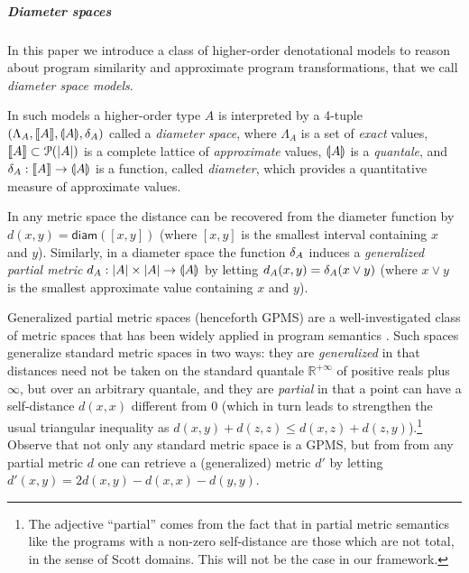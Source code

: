 





\subparagraph*{Diameter spaces}



In this paper we introduce a class of higher-order denotational models to reason about program similarity and approximate program transformations, that we call \emph{diameter space models}.

In such models a higher-order type $A$ is interpreted by a 4-tuple $(\Lambda_A, \llbracket A \rrbracket, \llparenthesis A \rrparenthesis, \delta_{A})$ called a \emph{diameter space}, where $\Lambda_A$ is a set of \emph{exact} values, $\llbracket A \rrbracket\subset \mathcal P(|A|)$ is a complete lattice of \emph{approximate} values, $\llparenthesis A \rrparenthesis$ is a \emph{quantale}, and $\delta_{A}: \llbracket A \rrbracket\to \llparenthesis A \rrparenthesis$ is a function, called \emph{diameter}, which provides a quantitative measure of approximate values.


In any metric space the distance can be recovered from the diameter function by $d(x,y)=\mathsf{diam}([x,y])$ (where $[x,y]$ is the smallest interval containing $x$ and $y$). Similarly, in a diameter space the function $\delta_{A}$ induces a \emph{generalized partial metric} $d_{A}:|A|\times |A|\to \llparenthesis A \rrparenthesis$ by letting $d_{A}(x,y)=\delta_{A}(x\vee y)$ (where $x\vee y$ is the smallest approximate value containing $x$ and $y$). 


Generalized partial metric spaces (henceforth GPMS) are a well-investigated class of metric spaces that has been widely applied in program semantics \cite{}. 
Such spaces generalize standard metric spaces in two ways: they are \emph{generalized} in that distances need not be taken on the standard quantale $\mathbb R^{+\infty}$ of positive reals plus $\infty$, but over an arbitrary quantale, and they are \emph{partial} in that a point can have a self-distance $d(x,x)$ different from $0$ (which in turn leads to strengthen the usual triangular inequality as $d(x,y) + d(z,z)\leq d(x,z)+d(z,y)$).\footnote{The adjective ``partial'' comes from the fact that in partial metric semantics like \cite{} the  programs with a non-zero self-distance are those which are not total, in the sense of Scott domains. This will not be the case in our framework. 
}   
Observe that not only any standard metric space is a GPMS, but from from any partial metric $d$ one can retrieve a (generalized) metric $d'$ by letting $d'(x,y)=2d(x,y)-d(x,x)-d(y,y)$.

